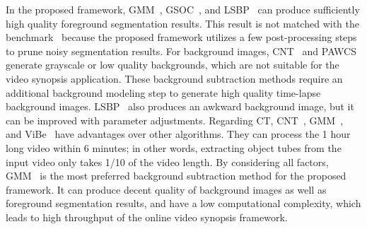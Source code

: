 \documentclass[11pt]{hyu_thesis}
\begin{document}
In the proposed framework, GMM~\cite{Zivkovic2004}, GSOC~\cite{GSOC}, and LSBP~\cite{Guo2016} can produce sufficiently high quality foreground segmentation results. This result is not matched with the benchmark~\cite{CDnet2014} because the proposed framework utilizes a few post-processing steps to prune noisy segmentation results. For background images, CNT~\cite{CNT} and PAWCS~\cite{St-Charles2015} generate grayscale or low quality backgrounds, which are not suitable for the video synopsis application. These background subtraction methods require an additional background modeling step to generate high quality time-lapse background images. LSBP~\cite{Guo2016} also produces an awkward background image, but it can be improved with parameter adjustments. Regarding CT, CNT~\cite{CNT}, GMM~\cite{Zivkovic2004}, and ViBe~\cite{Barnich2009ViBe,Barnich2011ViBe,VanDroogenbroeck2012Background,VanDroogenbroeck2014ViBe} have advantages over other algorithms. They can process the 1 hour long video within 6 minutes; in other words, extracting object tubes from the input video only takes 1/10 of the video length. By considering all factors, GMM~\cite{Zivkovic2004} is the most preferred background subtraction method for the proposed framework. It can produce decent quality of background images as well as foreground segmentation results, and have a low computational complexity, which leads to high throughput of the online video synopsis framework.
\end{document}

